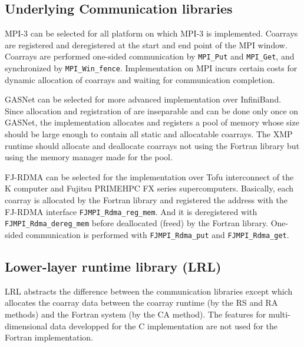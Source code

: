 \subsection{Underlying Communication libraries}

MPI-3 can be selected for all platform on which MPI-3 is implemented. Coarrays are 
registered and deregistered at the start and end point of the MPI window. 
Coarrays are performed one-sided communication by {\tt MPI\_Put} and {\tt MPI\_Get},
and synchronized by {\tt MPI\_Win\_fence}. 
Implementation on MPI incurs certain costs for dynamic allocation of coarrays and 
waiting for communication completion.

GASNet can be selected for more advanced implementation over InfiniBand. 
Since allocation and registration of are inseparable and can be done only once 
on GASNet, the implementation allocates and registers a pool of memory
whose size should be large enough to contain all static and allocatable coarrays.
The XMP runtime should allocate and deallocate coarrays not using the Fortran 
library but using the memory manager made for the pool.

FJ-RDMA can be selected for the implementation over Tofu interconnect of 
the K computer and Fujitsu PRIMEHPC FX series supercomputers. 
Basically, each coarray is allocated by the Fortran library and registered 
the address with the FJ-RDMA interface {\tt FJMPI\_Rdma\_reg\_mem}. 
And it is deregistered with {\tt FJMPI\_Rdma\_dereg\_mem} before deallocated 
(freed) by the Fortran library. 
One-sided communication is performed with {\tt FJMPI\_Rdma\_put} and 
{\tt FJMPI\_Rdma\_get}.


\subsection{Lower-layer runtime library (LRL)}

LRL abstracts the difference between the communication libraries except 
which allocates the coarray data between the coarray runtime 
(by the RS and RA methods) and the Fortran system (by the CA method).
The features for multi-dimensional data developped for the C implementation
are not used for the Fortran implementation.

